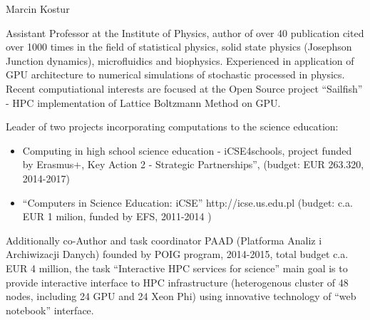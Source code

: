 \begin{participant}[PM=12,salary=1500]{Marcin Kostur}

Assistant Professor at the Institute of Physics, author of  over 40
publication cited over 1000 times in the field of statistical physics,
solid state physics (Josephson Junction dynamics), microfluidics and
biophysics. Experienced in application of GPU architecture to
numerical simulations of stochastic processed in physics. Recent
computiational interests are focused at the Open Source project
``Sailfish'' - HPC implementation of Lattice Boltzmann Method on GPU.

Leader of two projects incorporating computations to the science education:

\begin{itemize}
\item Computing in high school science education - iCSE4schools,
  project funded by Erasmus+, Key Action 2 - Strategic Partnerships'',
  (budget: EUR 263.320, 2014-2017)
\item ``Computers in Science Education: iCSE'' http://icse.us.edu.pl
  (budget: c.a. EUR 1 milion, funded by EFS, 2011-2014 )
\end{itemize}

Additionally co-Author and task coordinator PAAD (Platforma Analiz i
Archiwizacji Danych) founded by POIG program, 2014-2015, total budget
c.a. EUR 4 million, the task ``Interactive HPC services for science''
main goal is to provide interactive interface to HPC infrastructure
(heterogenous cluster of 48 nodes, including 24 GPU and 24 Xeon Phi)
using innovative technology of ``web notebook'' interface.  




\end{participant}
